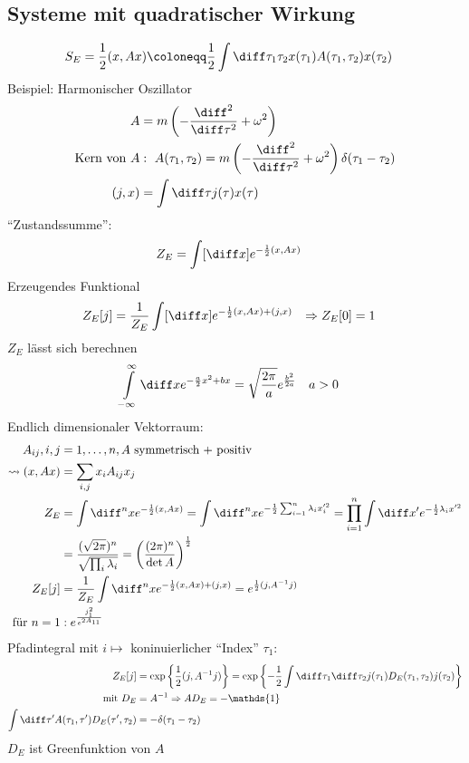 \subsection{Systeme mit quadratischer Wirkung}
	\begin{align*}
		S_E &= \frac{1}{2} (x, Ax) \coloneqq
		\frac{1}{2} \int \diff \tau_1 \tau_2 x(\tau_1) A(\tau_1, \tau_2) x(\tau_2)
	\end{align*}
Beispiel: Harmonischer Oszillator
	\begin{align*}
		A &= m \left(-\frac{\diff^2}{\diff \tau^2} + \omega^2\right) \\
		\text{Kern von }A&:~ A(\tau_1, \tau_2) = m \left(-\frac{\diff^2}{\diff \tau^2} + \omega^2\right) \delta(\tau_1 - \tau_2) \\
		(j, x) &= \int \diff \tau j(\tau) x(\tau) 
	\end{align*}
``Zustandssumme'': 
	\begin{align*}
		Z_E &= \int [\diff x] e^{-\frac{1}{2} (x, Ax)} 
	\end{align*}
Erzeugendes Funktional
	\begin{align*}
		Z_E[j] &= \frac{1}{Z_E} \int [\diff x] e^{-\frac{1}{2} (x, Ax) + (j,x)} 
		&\Rightarrow Z_E[0] &= 1 
	\end{align*}
$Z_E$ lässt sich berechnen
	\begin{align*}
		\int \limits_{-\infty}^{\infty} \diff x e^{-\frac{a}{2} x^2 + bx} &=
		\sqrt{\frac{2 \pi}{a}} e^{\frac{b^2}{2a}} &
		a &> 0
	\end{align*}
Endlich dimensionaler Vektorraum:
	\begin{align*}
		A_{ij} , i,j &= 1, \ldots, n, A \text{ symmetrisch + positiv} \\
		\leadsto (x, Ax) &= \sum_{i,j} x_i A_{ij} x_j \\
		Z_E &= \int \diff^n x e^{-\frac{1}{2} (x, Ax)}
		= \int \diff^n x e^{-\frac{1}{2} \sum_{i = 1}^{n} \lambda_i x_i'^2}
		= \prod_{i = 1}^{n} \int \diff x' e^{-\frac{1}{2} \lambda_i x'^2} \\
		&= \frac{(\sqrt{2 \pi})^n}{\sqrt{\prod_i \lambda_i}} = 
		\left(\frac{(2 \pi)^n}{\det A}\right)^{\frac{1}{2}} \\
		Z_E [j] &= \frac{1}{Z_E} \int \diff^n x e^{-\frac{1}{2} (x, Ax) + (j,x)} 
		= e^{\frac{1}{2} (j, A^{-1} j)} \\
		\text{für } n= 1 &: e^{\frac{j_1^2}{e^{2A_{11}}}}
	\end{align*}
Pfadintegral mit $i \mapsto$ koninuierlicher ``Index'' $\tau_1$:
	\begin{align*}
		Z_E [j] &= \exp \left\{\frac{1}{2} (j, A^{-1}j)\right\} =
		\exp \left\{-\frac{1}{2}\int \diff \tau_1 \diff \tau_2  j(\tau_1) D_E (\tau_1, \tau_2) j(\tau_2)\right\} \\
		\text{mit } D_E &= A^{-1} \Rightarrow A D_E = - \mathds{1} \\
		\int \diff \tau' A(\tau_1, \tau') D_E (\tau', \tau_2) &= -\delta (\tau_1- \tau_2)
	\end{align*}
$D_E$ ist Greenfunktion von $A$